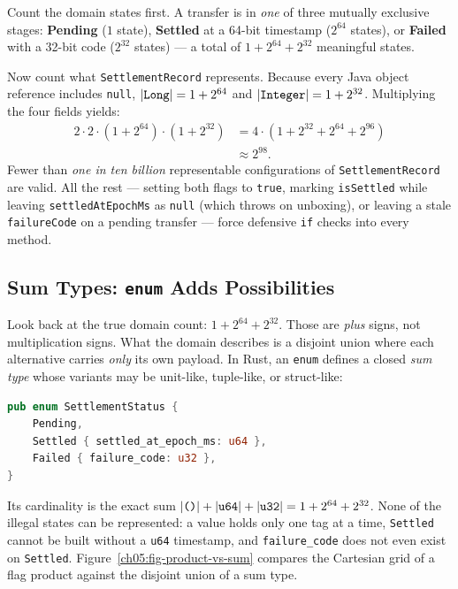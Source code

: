 Count the domain states first. A transfer is in \emph{one} of three mutually exclusive stages: \textbf{Pending} ($1$ state), \textbf{Settled} at a 64-bit timestamp ($2^{64}$ states), or \textbf{Failed} with a 32-bit code ($2^{32}$ states) --- a total of $1 + 2^{64} + 2^{32}$ meaningful states.

Now count what \texttt{SettlementRecord} represents. Because every Java object reference includes \texttt{null}, $\lvert\texttt{Long}\rvert = 1 + 2^{64}$ and $\lvert\texttt{Integer}\rvert = 1 + 2^{32}$. Multiplying the four fields yields:
\begin{align*}
  2 \cdot 2 \cdot (1 + 2^{64}) \cdot (1 + 2^{32}) &= 4 \cdot (1 + 2^{32} + 2^{64} + 2^{96}) \\
  &\approx 2^{98}.
\end{align*}
Fewer than \emph{one in ten billion} representable configurations of \texttt{SettlementRecord} are valid. All the rest --- setting both flags to \texttt{true}, marking \texttt{isSettled} while leaving \texttt{settledAtEpochMs} as \texttt{null} (which throws on unboxing), or leaving a stale \texttt{failureCode} on a pending transfer --- force defensive \texttt{if} checks into every method.

\subsection{Sum Types: \texttt{enum} Adds Possibilities}
\label{ch05:sum-types}

Look back at the true domain count: $1 + 2^{64} + 2^{32}$. Those are \emph{plus} signs, not multiplication signs. What the domain describes is a disjoint union where each alternative carries \emph{only} its own payload. In Rust, an \texttt{enum} defines a closed \emph{sum type} whose variants may be unit-like, tuple-like, or struct-like:

\begin{lstlisting}[language=Rust]
pub enum SettlementStatus {
    Pending,
    Settled { settled_at_epoch_ms: u64 },
    Failed { failure_code: u32 },
}
\end{lstlisting}

Its cardinality is the exact sum $\lvert\texttt{()}\rvert + \lvert\texttt{u64}\rvert + \lvert\texttt{u32}\rvert = 1 + 2^{64} + 2^{32}$. None of the illegal states can be represented: a value holds only one tag at a time, \texttt{Settled} cannot be built without a \texttt{u64} timestamp, and \texttt{failure\_code} does not even exist on \texttt{Settled}. Figure~\ref{ch05:fig-product-vs-sum} compares the Cartesian grid of a flag product against the disjoint union of a sum type.

